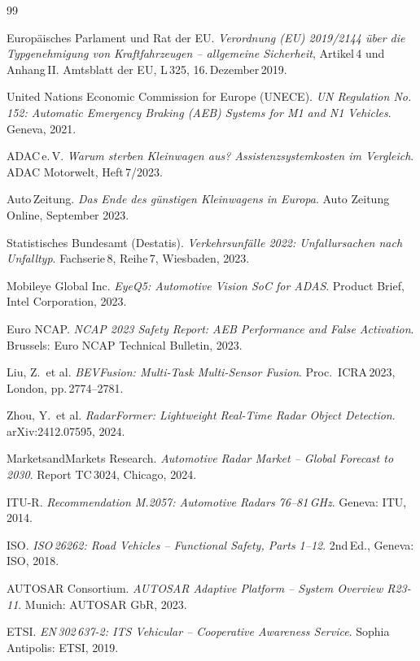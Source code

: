 ﻿\documentclass[a4paper,12pt]{article}
\theoremstyle{definition}
\begin{document}
\begin{thebibliography}{99}

Europ\"aisches Parlament und Rat der EU.
\textit{Verordnung (EU) 2019/2144 \"uber die Typgenehmigung von
Kraftfahrzeugen -- allgemeine Sicherheit}, Artikel\,4 und Anhang\,II.
Amtsblatt der EU, L\,325, 16.\,Dezember\,2019.

United Nations Economic Commission for Europe (UNECE).
\textit{UN Regulation No.\,152: Automatic Emergency Braking (AEB)
Systems for M1 and N1 Vehicles}. Geneva, 2021.

ADAC\,e.\,V.
\textit{Warum sterben Kleinwagen aus? Assistenzsystemkosten im Vergleich}.
ADAC Motorwelt, Heft\,7/2023.

Auto\,Zeitung.
\textit{Das Ende des g\"unstigen Kleinwagens in Europa}.
Auto Zeitung Online, September 2023.

Statistisches Bundesamt (Destatis).
\textit{Verkehrsunf\"alle 2022: Unfallursachen nach Unfalltyp}.
Fachserie\,8, Reihe\,7, Wiesbaden, 2023.

Mobileye Global Inc.
\textit{EyeQ5: Automotive Vision SoC for ADAS}.
Product Brief, Intel Corporation, 2023.

Euro NCAP.
\textit{NCAP 2023 Safety Report: AEB Performance and False Activation}.
Brussels: Euro NCAP Technical Bulletin, 2023.

Liu, Z.\ et al.
\textit{BEVFusion: Multi-Task Multi-Sensor Fusion}.
Proc.\ ICRA\,2023, London, pp.\,2774--2781.

Zhou, Y.\ et al.
\textit{RadarFormer: Lightweight Real-Time Radar Object Detection}.
arXiv:2412.07595, 2024.

MarketsandMarkets Research.
\textit{Automotive Radar Market -- Global Forecast to 2030}.
Report TC\,3024, Chicago, 2024.

ITU-R.
\textit{Recommendation M.2057: Automotive Radars 76--81\,GHz}.
Geneva: ITU, 2014.

ISO.
\textit{ISO\,26262: Road Vehicles -- Functional Safety, Parts 1--12}.
2nd\,Ed., Geneva: ISO, 2018.

AUTOSAR Consortium.
\textit{AUTOSAR Adaptive Platform -- System Overview R23-11}.
Munich: AUTOSAR GbR, 2023.

ETSI.
\textit{EN\,302\,637-2: ITS Vehicular -- Cooperative Awareness Service}.
Sophia Antipolis: ETSI, 2019.

\end{thebibliography}
\end{document}
